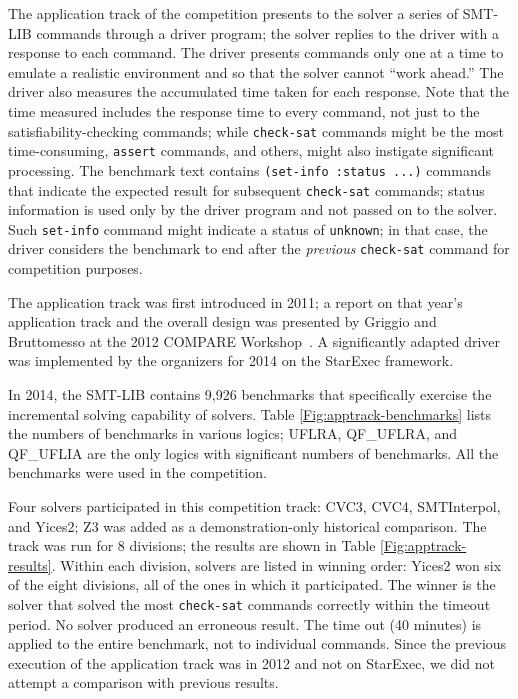 \documentclass[twoside,11pt]{article}
\begin{document}
The application track of the competition presents to the solver a series of SMT-LIB commands through a driver program; the solver replies to the driver with a
response to each command. The driver presents commands only one at a time to emulate a realistic environment and so that the solver cannot ``work ahead.'' The driver also measures the accumulated time taken for each response. Note that the time measured includes the response time to every command, not just to the satisfiability-checking commands; while \lstinline{check-sat} commands might be the most time-consuming, \lstinline{assert} commands, and others, might also instigate significant processing. The benchmark text contains \lstinline{(set-info :status ...)} commands that
indicate the expected result for subsequent \lstinline{check-sat} commands; status information is used only by the driver program and not passed on to the solver. Such \lstinline{set-info} command might indicate a status of \lstinline{unknown}; in that case, the driver
considers the benchmark to end after the \emph{previous} \lstinline{check-sat} command for competition purposes.

The application track was first introduced in 2011; a report on that year's application track and the overall design was presented by Griggio and Bruttomesso at the 2012 COMPARE Workshop~\cite{ag+rb+12}. A significantly adapted driver was implemented by the organizers for 2014 on the StarExec framework.

In 2014, the SMT-LIB contains 9,926 benchmarks that  specifically  exercise the incremental solving capability of solvers. Table \ref{Fig:apptrack-benchmarks} lists the numbers of benchmarks in various logics; UFLRA, QF\_UFLRA, and QF\_UFLIA are the only logics with significant numbers of benchmarks. All the benchmarks were used in the competition.

Four solvers participated in this competition track: CVC3, CVC4, SMTInterpol, and Yices2; Z3 was added as a demonstration-only historical comparison. The track was run for 8 divisions; the results are shown in Table \ref{Fig:apptrack-results}. Within each division, solvers are listed in winning order: Yices2 won six of the eight divisions, all of the ones in which it participated. The winner is the solver that solved the most \lstinline{check-sat} commands correctly within the timeout period. No solver produced an erroneous result. The time out (40 minutes) is applied to the entire benchmark, not to individual commands. Since the previous execution of the application track was in 2012 and not on StarExec, we did not attempt a comparison with previous results.
\end{document}
